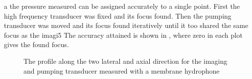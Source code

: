 


a%
the pressure measured can be assigned accurately to a single point.
First the high frequency transducer was fixed and its focus found.
Then the pumping transducer was moved and its focus found iteratively until it too shared the same focus as the imagi5%
The accuracy attained is shown in ,
where zero in each plot gives  the found focus.

\begin{centering}
\begin{figure}
   \caption{
     The profile along the two lateral and axial direction for the imaging and pumping transducer measured with a membrane hydrophone
   }
   \label{fig:profiles}
\end{figure}
\end{centering}






